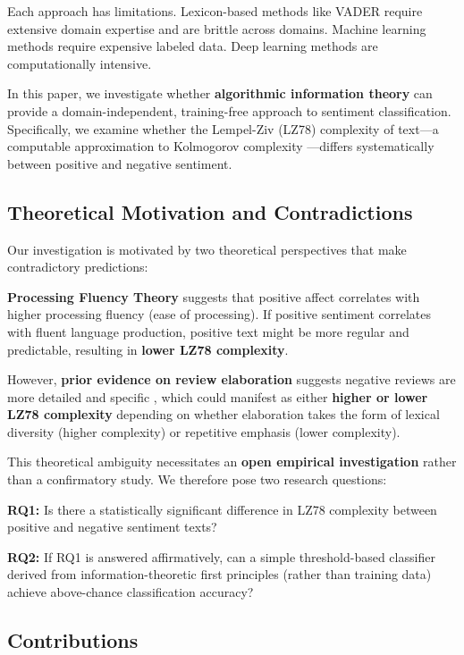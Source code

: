 \documentclass[11pt,letterpaper]{article}
\begin{document}
Each approach has limitations. Lexicon-based methods like VADER \cite{Hutto2014} require extensive domain expertise and are brittle across domains. Machine learning methods require expensive labeled data. Deep learning methods are computationally intensive.

In this paper, we investigate whether \textbf{algorithmic information theory} can provide a domain-independent, training-free approach to sentiment classification. Specifically, we examine whether the Lempel-Ziv (LZ78) complexity \cite{Ziv1978} of text---a computable approximation to Kolmogorov complexity \cite{Li2008}---differs systematically between positive and negative sentiment.

\subsection{Theoretical Motivation and Contradictions}

Our investigation is motivated by two theoretical perspectives that make contradictory predictions:

\textbf{Processing Fluency Theory} \cite{Reber2004} suggests that positive affect correlates with higher processing fluency (ease of processing). If positive sentiment correlates with fluent language production, positive text might be more regular and predictable, resulting in \textbf{lower LZ78 complexity}.

However, \textbf{prior evidence on review elaboration} suggests negative reviews are more detailed and specific \cite{Colostate2018}, which could manifest as either \textbf{higher or lower LZ78 complexity} depending on whether elaboration takes the form of lexical diversity (higher complexity) or repetitive emphasis (lower complexity).

This theoretical ambiguity necessitates an \textbf{open empirical investigation} rather than a confirmatory study. We therefore pose two research questions:

\textbf{RQ1:} Is there a statistically significant difference in LZ78 complexity between positive and negative sentiment texts?

\textbf{RQ2:} If RQ1 is answered affirmatively, can a simple threshold-based classifier derived from information-theoretic first principles (rather than training data) achieve above-chance classification accuracy?

\subsection{Contributions}
\end{document}
